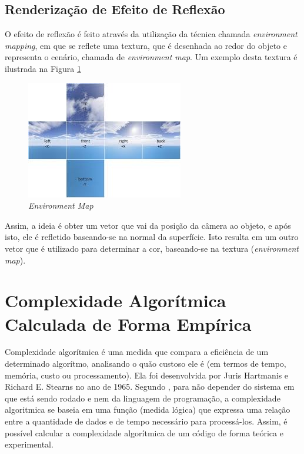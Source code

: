 {	\subsection{Renderização de Efeito de Reflexão}
	\label{ref_t}

	O efeito de reflexão é feito através da utilização da técnica chamada \textit{environment mapping}, em que se reflete uma textura, que é desenhada ao redor do objeto e representa o cenário, chamada de \textit{environment map}. Um exemplo desta textura é ilustrada na Figura \ref{environment}

	\begin{figure}[ht]
	\centering
		\includegraphics[keepaspectratio=true,scale=1.0]{figuras/envmap.jpg}
	\caption{\textit{Environment Map}}
	\label{environment}
	\end{figure}

	Assim, a ideia é obter um vetor que vai da posição da câmera ao objeto, e após isto, ele é refletido baseando-se na normal da superfície. Isto resulta em um outro vetor que é utilizado para determinar a cor, baseando-se na textura (\textit{environment map}).

\section{Complexidade Algorítmica Calculada de Forma Empírica}
\label{metminquad}

	Complexidade algorítmica é uma medida que compara a eficiência de um determinado algorítmo, analisando o quão custoso ele é (em termos de tempo, memória, custo ou processamento). Ela foi desenvolvida por Juris Hartmanis e Richard E. Stearns no ano de 1965. Segundo \cite{complexidade}, para não depender do sistema em que está sendo rodado e nem da linguagem de programação, a complexidade algoritmica se baseia em uma função (medida lógica) que expressa uma relação entre a quantidade de dados e de tempo necessário para processá-los. Assim, é possível calcular a complexidade algorítmica de um código de forma teórica e experimental.

}
